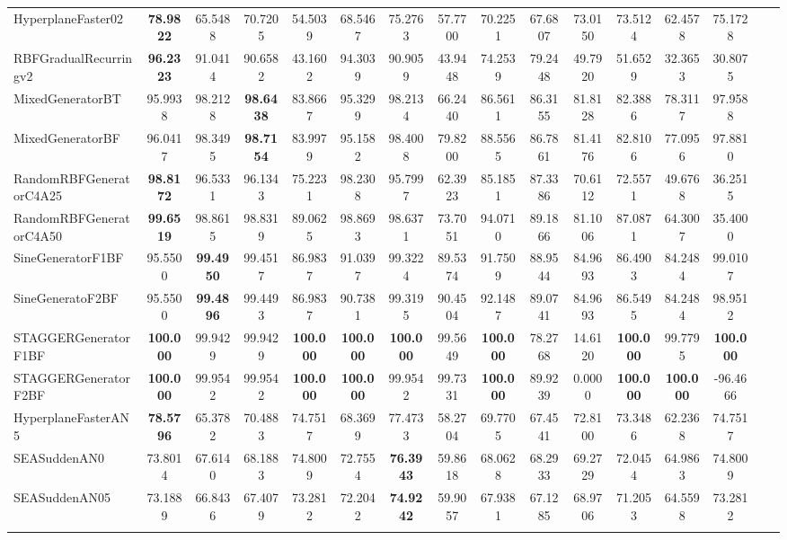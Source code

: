 \documentclass[reqno]{vcuthesis}
\numberwithin{equation}{chapter}
\begin{document}
\begin{table}[b!]
{\begin{tabularx}{1.545\textwidth}{l@{\extracolsep{\fill}}ccccccccccccccc}
HyperplaneFaster02 &\textbf{78.9822} &65.5488 &70.7205 &54.5039 &68.5467 &75.2763 &57.7700 &70.2251 &67.6807 &73.0150 &73.5124 &62.4578 &75.1728 &  \\
RBFGradualRecurringv2 &\textbf{96.2323} &91.0414 &90.6582 &43.1602 &94.3039 &90.9059 &43.9448 &74.2539 &79.2448 &49.7920 &51.6529 &32.3653 &30.8075 &  \\
MixedGeneratorBT &95.9938 &98.2128 &\textbf{98.6438} &83.8667 &95.3299 &98.2134 &66.2440 &86.5611 &86.3155 &81.8128 &82.3886 &78.3117 &97.9588 &  \\
MixedGeneratorBF &96.0417 &98.3495 &\textbf{98.7154} &83.9979 &95.1582 &98.4008 &79.8200 &88.5565 &86.7861 &81.4176 &82.8106 &77.0956 &97.8810 &  \\
RandomRBFGeneratorC4A25 &\textbf{98.8172} &96.5331 &96.1343 &75.2231 &98.2308 &95.7997 &62.3923 &85.1851 &87.3386 &70.6112 &72.5571 &49.6768 &36.2515 &  \\
RandomRBFGeneratorC4A50 &\textbf{99.6519} &98.8615 &98.8319 &89.0625 &98.8693 &98.6371 &73.7051 &94.0710 &89.1866 &81.1006 &87.0871 &64.3007 &35.4000 &  \\
SineGeneratorF1BF &95.5500 &\textbf{99.4950} &99.4517 &86.9837 &91.0397 &99.3224 &89.5374 &91.7509 &88.9544 &84.9693 &86.4903 &84.2484 &99.0107 &  \\
SineGeneratoF2BF &95.5500 &\textbf{99.4896} &99.4493 &86.9837 &90.7381 &99.3195 &90.4504 &92.1487 &89.0741 &84.9693 &86.5495 &84.2484 &98.9512 &  \\
STAGGERGeneratorF1BF &\textbf{100.000} &99.9429 &99.9429 &\textbf{100.000} &\textbf{100.000} &\textbf{100.000} &99.5649 &\textbf{100.000} &78.2768 &14.6120 &\textbf{100.000} &99.7795 &\textbf{100.000} &  \\
STAGGERGeneratorF2BF &\textbf{100.000} &99.9542 &99.9542 &\textbf{100.000} &\textbf{100.000} &99.9542 &99.7331 &\textbf{100.000} &89.9239 &0.0000 &\textbf{100.000} &\textbf{100.000} &-96.4666 &  \\
HyperplaneFasterAN5 &\textbf{78.5796} &65.3782 &70.4883 &74.7517 &68.3699 &77.4733 &58.2704 &69.7705 &67.4541 &72.8100 &73.3486 &62.2368 &74.7517 &  \\
SEASuddenAN0 &73.8014 &67.6140 &68.1883 &74.8009 &72.7554 &\textbf{76.3943} &59.8618 &68.0628 &68.2933 &69.2729 &72.0454 &64.9863 &74.8009 &  \\
SEASuddenAN05 &73.1889 &66.8436 &67.4079 &73.2812 &72.2042 &\textbf{74.9242} &59.9057 &67.9381 &67.1285 &68.9706 &71.2053 &64.5598 &73.2812 &  \\
\noalign{\smallskip}\hline\noalign{\smallskip}

\end{tabularx}}
\end{table}
\end{document}
